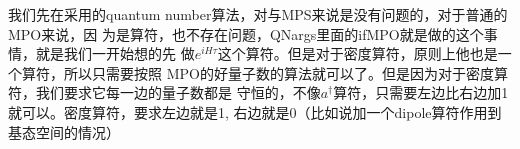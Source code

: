 \documentclass[a4paper,11pt]{ctexart}
\begin{document}
我们先在采用的quantum number算法，对与MPS来说是没有问题的，对于普通的MPO来说，因
为是算符，也不存在问题，QNargs里面的ifMPO就是做的这个事情，就是我们一开始想的先
做$e^{iH\tau}$这个算符。但是对于密度算符，原则上他也是一个算符，所以只需要按照
MPO的好量子数的算法就可以了。但是因为对于密度算符，我们要求它每一边的量子数都是
守恒的，不像$a^\dagger$算符，只需要左边比右边加1就可以。密度算符，要求左边就是1,
右边就是0（比如说加一个dipole算符作用到基态空间的情况）
\end{document}
